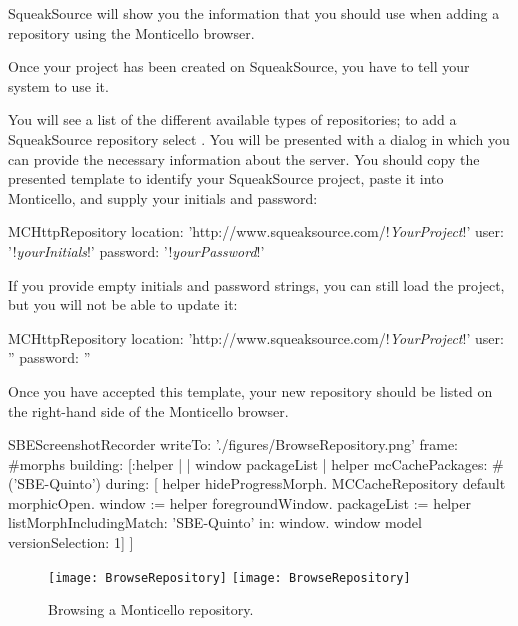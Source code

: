 \documentclass[a4paper,10pt,twoside]{book}
\begin{document}
SqueakSource will show you the information that you should use when adding a repository using the Monticello browser.

Once your project has been created on SqueakSource, you have to tell your \squeak system to use it.

You will see a list of the different available types of repositories; to add a SqueakSource repository select .
You will be presented with a dialog in which you can provide the necessary information about the server.
You should copy the presented template to identify your SqueakSource project, paste it into Monticello, and supply your initials and password:

\begin{code}{}
MCHttpRepository
    location: 'http://www.squeaksource.com/!\emph{YourProject}!'
    user: '!\emph{yourInitials}!'
    password: '!\emph{yourPassword}!'
\end{code}

\noindent
If you provide empty initials and password strings, you can still load the project, but you will not be able to update it:

\begin{code}{}
MCHttpRepository
    location: 'http://www.squeaksource.com/!\emph{YourProject}!'
    user: ''
    password: ''
\end{code}

Once you have accepted this template, your new repository should be listed on the right-hand side of the Monticello browser.

\begin{ExecuteSmalltalkScript}
SBEScreenshotRecorder writeTo: './figures/BrowseRepository.png' frame: #morphs building: [:helper |
	| window packageList |
	helper mcCachePackages: #('SBE-Quinto') during: [
		helper hideProgressMorph.
		MCCacheRepository default morphicOpen.
		window := helper foregroundWindow.
		packageList := helper listMorphIncludingMatch: 'SBE-Quinto' in: window.
		window model versionSelection: 1]
]
\end{ExecuteSmalltalkScript}
\begin{figure}[h]
\ifluluelse
	{{\texttt{[image: BrowseRepository]}}}
	{{\texttt{[image: BrowseRepository]}}}
\caption{Browsing a Monticello repository.
\label{fig:monticello3}}
\end{figure}
\end{document}
